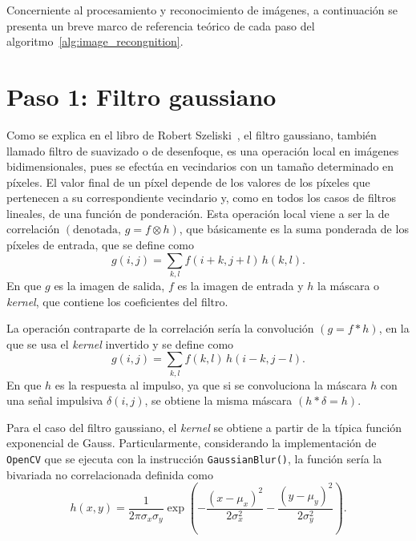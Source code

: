 Concerniente al procesamiento y reconocimiento de imágenes, a continuación se presenta un breve marco de referencia teórico de cada paso del algoritmo~\ref{alg:image_recongnition}.

\section*{Paso 1: Filtro gaussiano}
\label{sec:gaussian_filter}
Como se explica en el libro de Robert Szeliski~\citeyearpar{Richard2011}, el filtro gaussiano, también llamado filtro de suavizado o de desenfoque, es una operación local en imágenes bidimensionales, pues se efectúa en vecindarios con un tamaño determinado en píxeles.
El valor final de un píxel depende de los valores de los píxeles que pertenecen a su correspondiente vecindario y, como en todos los casos de filtros lineales, de una función de ponderación.
Esta operación local viene a ser la de correlación $\left(\text{denotada, } g = f \otimes h\right)$, que básicamente es la suma ponderada de los píxeles de entrada, que se define como
%
\begin{equation}
    \label{eq:correlation}
    g(i, j) = \sum_{k, l} f(i + k, j + l)\,h(k, l).
\end{equation}
%
En que $g$ es la imagen de salida, $f$ es la imagen de entrada y $h$ la máscara o \emph{kernel}, que contiene los coeficientes del filtro.

La operación contraparte de la correlación sería la convolución $\left(g = f \ast h\right)$, en la que se usa el \emph{kernel} invertido y se define como
%
\begin{equation}
    \label{eq:convolution}
    g(i, j) = \sum_{k, l} f(k, l)\,h(i - k, j - l).
\end{equation}
%
En que $h$ es la respuesta al impulso, ya que si se convoluciona la máscara $h$ con una señal impulsiva $\delta(i, j)$, se obtiene la misma máscara $\left(h \ast \delta = h\right)$.

Para el caso del filtro gaussiano, el \emph{kernel} se obtiene a partir de la típica función exponencial de Gauss.
Particularmente, considerando la implementación de \texttt{\small OpenCV} que se ejecuta con la instrucción \texttt{\small GaussianBlur()}, la función sería la bivariada no correlacionada definida como
%
\begin{equation}
    \label{eq:bivariate_gaussian}
    h(x, y) = \frac{1}{2\pi\sigma_x\sigma_y}
    \exp\left(-\frac{\left(x - \mu_x\right)^2}{2\sigma_x^2} - \frac{\left(y - \mu_y\right)^2}{2\sigma_y^2}\right).
\end{equation}


